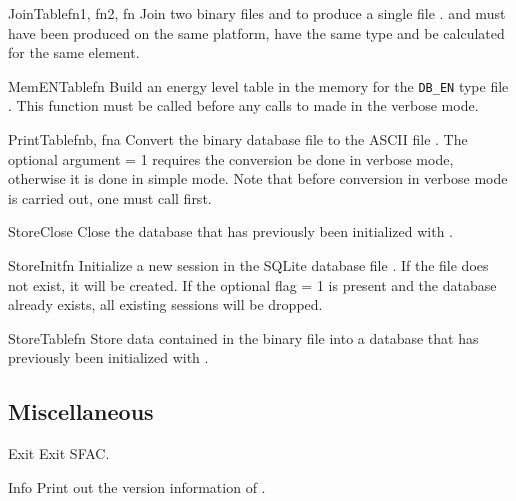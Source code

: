 \begin{fundesc}{JoinTable}{fn1, fn2, fn}
Join two binary files  and  to produce a single file
.  and  must have been produced on the same
platform, have the same type and be calculated for the same element.
\end{fundesc}

\begin{fundesc}{MemENTable}{fn}
Build an energy level table in the memory for the \texttt{DB\_EN} type file
. This function must be called before any calls to 
made in the verbose mode.
\end{fundesc}

\begin{fundesc}{PrintTable}{fnb, fna}
Convert the binary database file  to the ASCII file . The
optional argument  = 1 requires the conversion be done in verbose
mode, otherwise it is done in simple mode. Note that before conversion in
verbose mode is carried out, one must call  first.
\end{fundesc}

\begin{fundesc}{StoreClose}{}
Close the database that has previously been initialized with
.
\end{fundesc}

\begin{fundesc}{StoreInit}{fn }
Initialize a new session in the SQLite database file . If the file does
not exist, it will be created. If the optional flag  = 1 is present
and the database already exists, all existing sessions will be dropped.
\end{fundesc}

\begin{fundesc}{StoreTable}{fn}
Store data contained in the binary file  into a database that has
previously been initialized with .
\end{fundesc}


\subsection{Miscellaneous}

\begin{fundesc}{Exit}{}
Exit SFAC.
\end{fundesc}

\begin{fundesc}{Info}{}
Print out the version information of \cFAC.
\end{fundesc}

